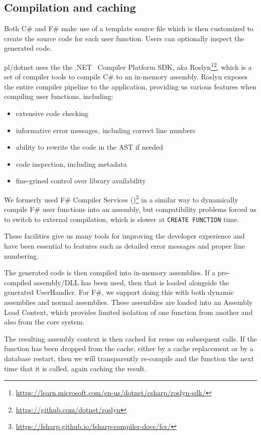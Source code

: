 \documentclass[sigconf,techreport,authorversion,nonacm]{acmart}
\newcommand{\dotnet}{.NET }
\begin{document}
\subsection{Compilation and caching}

Both C\# and F\# make use of a template source file which is then
customized to create the source code for each user function.  Users
can optionally inspect the generated code.

pl/dotnet uses the the \dotnet\ Compiler Platform SDK, aka Roslyn\footnote{\url{https://learn.microsoft.com/en-us/dotnet/csharp/roslyn-sdk/}}\footnote{\url{https://github.com/dotnet/roslyn}},
which is a set of compiler tools to compile C\# to an in-memory
assembly. Roslyn exposes the entire compiler pipeline to the
application, providing us various features when compiling
user functions, including:

\begin{itemize}[itemsep=0pt]
    \item extensive code checking
    \item informative error messages, including correct line numbers
    \item ability to rewrite the code in the AST if needed
    \item code inspection, including metadata
    \item fine-grined control over library availability
\end{itemize}

We formerly used F\# Compiler Services
()\footnote{\url{https://fsharp.github.io/fsharp-compiler-docs/fcs/}}
in a similar way to dynamically compile F\# user functions into an
assembly, but compatibility problems forced us to switch to external
compilation, which is slower at \texttt{CREATE FUNCTION} time.

These facilities give us many tools for improving the developer experience
and have been essential to features such as detailed error messages and
proper line numbering.

The generated code is then compiled into in-memory assemblies. If
a pre-compiled assembly/DLL has been used, then that is loaded
alongside the generated UserHandler. For F\#, we support doing this
with both dynamic assemblies and normal assemblies. These assemblies
are loaded into an Assembly Load Context, which provides limited
isolation of one function from another and also from the core system.

The resulting assembly context is then cached for reuse on subsequent
calls. If the function has been dropped from the cache, either by
a cache replacement or by a database restart, then we will transparently
re-compile and the function the next time that it is called, again
caching the result.
\end{document}
